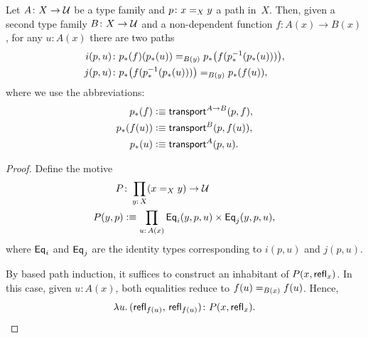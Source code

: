 \begin{lem}\label{lem:non-dependent-i-j-paths}
    Let\/ $A\colon X\to\univ$ be a type family and\/ $p\colon x\eq Xy$ a path in~$X$. Then, given a second type family\/ $B\colon X\to\univ$ and a non-dependent function\/ $f\colon A(x)\to B(x)$, for any\/ $u\colon A(x)$ there are two paths
    \begin{equation}\label{eq:non-dependent-i-j-paths}
        \begin{aligned}
            i(p,u)&\colon p_*(f)(p_*(u))
                \eq{B(y)}p_*\bigl(f(p^{-1}_*(p_*(u)))\bigr),\\
            j(p,u)&\colon p_*\bigl(f(p^{-1}_*(p_*(u)))\bigr)
                \eq{B(y)}p_*(f(u)),
        \end{aligned}
    \end{equation}
    where we use the abbreviations:
    \begin{equation}\label{eq:non-dependent-p*-meanings}
        \begin{aligned}
            p_*(f)&\mathrel{\vcentcolon}\equiv\mathsf{transport}^{A\to B}(p,f),\\
            p_*(f(u))&\mathrel{\vcentcolon}\equiv\mathsf{transport}^B(p,f(u)),\\
            p_*(u)&\mathrel{\vcentcolon}\equiv\mathsf{transport}^A(p,u).
        \end{aligned}
    \end{equation}
\end{lem}

\begin{proof}
    Define the motive
    \begin{align*}
        P&\colon\prod_{y\colon X}(x\eq Xy)\to\univ\\
        P(y,p)&\defeq \prod_{u\colon A(x)}
            \fun{Eq}_i(y,p,u) \times \fun{Eq}_j(y,p,u),
    \end{align*}
    where $\mathsf{Eq}_i$ and $\mathsf{Eq}_j$ are the identity types corresponding to $i(p,u)$ and $j(p,u)$.
    
    By based path induction, it suffices to construct an inhabitant of $P(x,\mathsf{refl}_x)$.
    In this case, given $u\colon A(x)$, both equalities reduce to $f(u)\mathrel{=_{B(x)}}f(u)$. Hence,
    \[
        \lambda u.\,(\fun{refl}_{f(u)},\,\fun{refl}_{f(u)})
            \colon P(x,\fun{refl}_x).
    \]
\end{proof}


